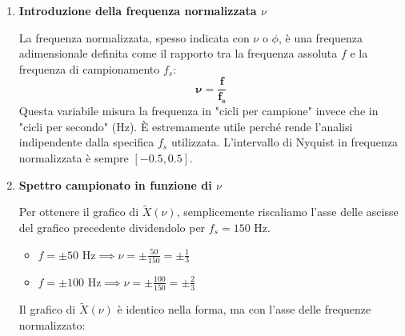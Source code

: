 \begin{soluzione}{16}
\begin{enumerate}
        \begin{center}
        \end{center}

        \item \textbf{Introduzione della frequenza normalizzata $\nu$}
        
        La frequenza normalizzata, spesso indicata con $\nu$ o $\phi$, è una frequenza adimensionale definita come il rapporto tra la frequenza assoluta $f$ e la frequenza di campionamento $f_s$:
        \[
            \mathbf{\nu = \frac{f}{f_s}}
        \]
        Questa variabile misura la frequenza in "cicli per campione" invece che in "cicli per secondo" (Hz). È estremamente utile perché rende l'analisi indipendente dalla specifica $f_s$ utilizzata. L'intervallo di Nyquist in frequenza normalizzata è sempre $[-0.5, 0.5]$.
        
        \item \textbf{Spettro campionato in funzione di $\nu$}
        
        Per ottenere il grafico di $\tilde{X}(\nu)$, semplicemente riscaliamo l'asse delle ascisse del grafico precedente dividendolo per $f_s = 150$ Hz.
        \begin{itemize}
            \item $f = \pm 50 \text{ Hz} \implies \nu = \pm\frac{50}{150} = \pm\frac{1}{3}$
            \item $f = \pm 100 \text{ Hz} \implies \nu = \pm\frac{100}{150} = \pm\frac{2}{3}$
        \end{itemize}
        Il grafico di $\tilde{X}(\nu)$ è identico nella forma, ma con l'asse delle frequenze normalizzato:
        

\end{enumerate}
\end{soluzione}
